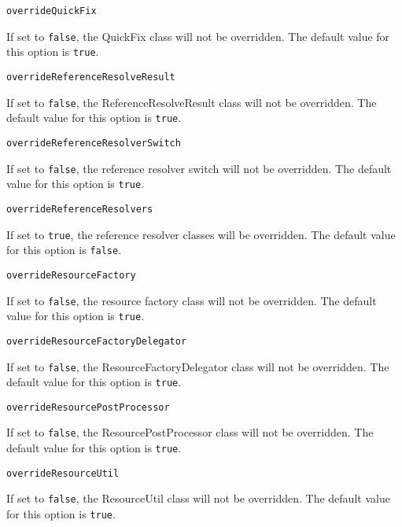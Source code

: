 \noindent\texttt{overrideQuickFix}
\begin{myindentpar}{1cm}
If set to \texttt{false}, the QuickFix class will not be overridden. The default value for this option is \texttt{true}.
\end{myindentpar}

\noindent\texttt{overrideReferenceResolveResult}
\begin{myindentpar}{1cm}
If set to \texttt{false}, the ReferenceResolveResult class will not be overridden. The default value for this option is \texttt{true}.
\end{myindentpar}

\noindent\texttt{overrideReferenceResolverSwitch}
\begin{myindentpar}{1cm}
If set to \texttt{false}, the reference resolver switch will not be overridden. The default value for this option is \texttt{true}.
\end{myindentpar}

\noindent\texttt{overrideReferenceResolvers}
\begin{myindentpar}{1cm}
If set to \texttt{true}, the reference resolver classes will be overridden. The default value for this option is \texttt{false}.
\end{myindentpar}

\noindent\texttt{overrideResourceFactory}
\begin{myindentpar}{1cm}
If set to \texttt{false}, the resource factory class will not be overridden. The default value for this option is \texttt{true}.
\end{myindentpar}

\noindent\texttt{overrideResourceFactoryDelegator}
\begin{myindentpar}{1cm}
If set to \texttt{false}, the ResourceFactoryDelegator class will not be overridden. The default value for this option is \texttt{true}.
\end{myindentpar}

\noindent\texttt{overrideResourcePostProcessor}
\begin{myindentpar}{1cm}
If set to \texttt{false}, the ResourcePostProcessor class will not be overridden. The default value for this option is \texttt{true}.
\end{myindentpar}

\noindent\texttt{overrideResourceUtil}
\begin{myindentpar}{1cm}
If set to \texttt{false}, the ResourceUtil class will not be overridden. The default value for this option is \texttt{true}.
\end{myindentpar}

